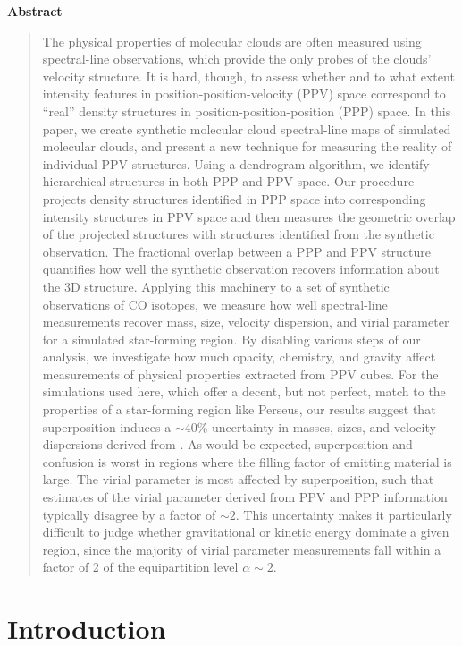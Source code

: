  \begin{center}
     \bfseries Abstract
     \end{center}
     \begin{quote}
The physical properties of molecular clouds are often measured using spectral-line observations, which provide the only probes of the clouds' velocity structure.  It is hard, though, to assess whether and to what extent intensity features in position-position-velocity (PPV) space correspond to ``real'' density structures in position-position-position (PPP) space. In this paper, we create synthetic molecular cloud spectral-line maps of simulated molecular clouds, and present a new technique for measuring the reality of individual PPV structures. Using a dendrogram algorithm, we identify hierarchical structures in both PPP and PPV space. Our procedure projects density structures identified in PPP space into corresponding intensity structures in PPV space and then measures the geometric overlap of the projected structures with structures identified from the synthetic observation.  The fractional overlap between a PPP and PPV structure quantifies how well the synthetic observation recovers information about the 3D structure. Applying this machinery to a set of synthetic observations of CO isotopes, we  measure how well spectral-line measurements recover mass, size, velocity dispersion, and virial parameter for a simulated star-forming region. By disabling various steps of our analysis, we investigate how much opacity, chemistry, and gravity affect measurements of  physical properties extracted from PPV cubes.  For the simulations used here, which offer a decent, but not perfect, match to the properties of a star-forming region like Perseus, our results suggest that superposition induces a $\sim 40$\% uncertainty in masses, sizes, and velocity dispersions derived from \coc. As would be expected, superposition and confusion is worst in regions where the filling factor of emitting material is large.  The virial parameter is most affected by superposition, such that estimates of the virial parameter derived from PPV and PPP information typically disagree by a factor of $\sim 2$. This uncertainty makes it particularly difficult to judge whether gravitational or kinetic energy dominate a given region, since the majority of virial parameter measurements fall within a factor of 2 of the equipartition level $\alpha \sim 2$.
\end{quote}

\section{Introduction}

